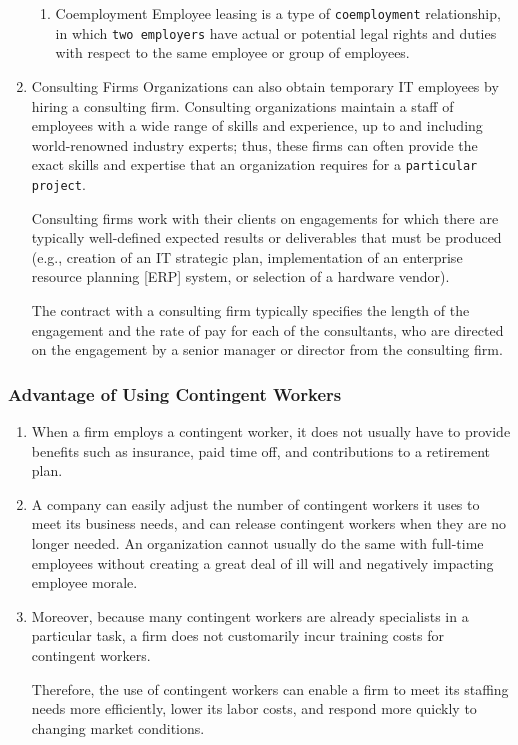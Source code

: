 \documentclass[11pt]{article}
\begin{document}
\begin{enumerate}
\begin{enumerate}
\item Coemployment
\label{sec:org8154d35}
Employee leasing is a type of \texttt{coemployment} relationship, in which \texttt{two employers} have actual or potential legal rights and duties with respect to the same employee or group of employees.
\end{enumerate}

\item Consulting Firms
\label{sec:orgf0d09d1}
Organizations can also obtain temporary IT employees by hiring a consulting firm. Consulting organizations maintain a staff of employees with a wide range of skills and experience, up to and including world-renowned industry experts; thus, these firms can often provide the exact skills and expertise that an organization requires for a \texttt{particular project}.

Consulting firms work with their clients on engagements for which there are typically well-defined expected results or deliverables that must be produced (e.g., creation of an IT strategic plan, implementation of an enterprise resource planning [ERP] system, or selection of a hardware vendor).

The contract with a consulting firm typically specifies the length of the engagement and the rate of pay for each of the consultants, who are directed on the engagement by a senior manager or director from the consulting firm.
\end{enumerate}

\subsubsection{Advantage of Using Contingent Workers}
\label{sec:org5ad4906}
\begin{enumerate}
\item When a firm employs a contingent worker, it does not usually have to provide benefits such as insurance, paid time off, and contributions to a retirement plan.

\item A company can easily adjust the number of contingent workers it uses to meet its business needs, and can release contingent workers when they are no longer needed. An organization cannot usually do the same with full-time employees without creating a great deal of ill will and negatively impacting employee morale.

\item Moreover, because many contingent workers are already specialists in a particular task, a firm does not customarily incur training costs for contingent workers.

Therefore, the use of contingent workers can enable a firm to meet its staffing needs more efficiently, lower its labor costs, and respond more quickly to changing market conditions.
\end{enumerate}
\end{document}
